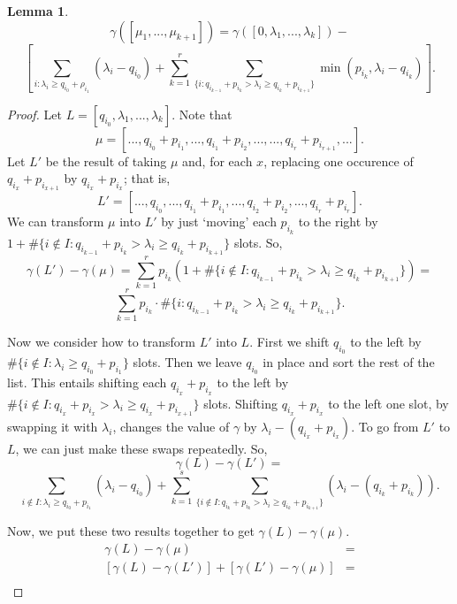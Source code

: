 \documentclass[12pt,psamsfonts]{article}
\newtheorem{lemma}[theorem]{Lemma}
\begin{document}
\begin{lemma}\label{springer_fiber_dim}
    \[\gamma([\mu_1, ..., \mu_{k + 1}]) = \gamma([0, \lambda_1, ..., \lambda_k]) - \] 
    \[\left[\sum_{i : \lambda_i \geq q_{i_0} + \rho_{i_1}} (\lambda_i - q_{i_0}) + \sum_{k = 1}^r \sum_{\{i : q_{i_{k - 1}} + p_{i_k} > \lambda_i \geq q_{i_k} + p_{i_{k + 1}}\}} \min(p_{i_k}, \lambda_i - q_{i_k})\right].\]
\end{lemma}
\begin{proof}
    Let \(L = [q_{i_0}, \lambda_1, ..., \lambda_k]\).
    Note that
    \[\mu = [..., q_{i_0} + p_{i_1}, ..., q_{i_1} + p_{i_2}, ..., ..., q_{i_r} + p_{i_{r + 1}}, ...].\]
    Let \(L'\) be the result of taking \(\mu\) and, for each \(x\), replacing one occurence of \(q_{i_x} + p_{i_{x + 1}}\) by \(q_{i_x} + p_{i_x}\); that is,
    \[L' = [..., q_{i_0}, ..., q_{i_1} + p_{i_1}, ..., q_{i_2} + p_{i_2}, ..., q_{i_r} + p_{i_r}].\]
    We can transform \(\mu\) into \(L'\) by just `moving' each \(p_{i_k}\) to the right by \(1 + \#\{i \notin I : q_{i_{k - 1}} + p_{i_k} > \lambda_i \geq q_{i_k} + p_{i_{k + 1}}\}\) slots.
    So,
    \[\gamma(L') - \gamma(\mu) = \sum_{k = 1}^r p_{i_k} (1 + \#\{i \notin I : q_{i_{k - 1}} + p_{i_k} > \lambda_i \geq q_{i_k} + p_{i_{k + 1}}\}) = \]
    \[\sum_{k = 1}^r p_{i_k} \cdot \#\{i : q_{i_{k - 1}} + p_{i_k} > \lambda_i \geq q_{i_k} + p_{i_{k + 1}}\}.\]
    \par Now we consider how to transform \(L'\) into \(L\).
    First we shift \(q_{i_0}\) to the left by \(\#\{i \notin I : \lambda_i \geq q_{i_0} + p_{i_1}\}\) slots.
    Then we leave \(q_{i_0}\) in place and sort the rest of the list.
    This entails shifting each \(q_{i_x} + p_{i_x}\) to the left by \(\#\{i \notin I : q_{i_x} + p_{i_x} > \lambda_i \geq q_{i_x} + p_{i_{x + 1}}\}\) slots.
    Shifting \(q_{i_x} + p_{i_x}\) to the left one slot, by swapping it with \(\lambda_i\), changes the value of \(\gamma\) by \(\lambda_i - (q_{i_x} + p_{i_x})\).
    To go from \(L'\) to \(L\), we can just make these swaps repeatedly.  
    So,
    \[\gamma(L) - \gamma(L') = \]
    \[\sum_{i \notin I : \lambda_i \geq q_{i_0} + p_{i_1}} (\lambda_i - q_{i_0}) + \sum_{k = 1}^s \sum_{\{i \notin I : q_{i_k} + p_{i_k} > \lambda_i \geq q_{i_k} + p_{i_{k + 1}}\}} (\lambda_i - (q_{i_k} + p_{i_k})).\]
    \par Now, we put these two results together to get \(\gamma(L) - \gamma(\mu)\).
    \begin{align*}
        \gamma(L) - \gamma(\mu) & = \\
        [\gamma(L) - \gamma(L')] + [\gamma(L') - \gamma(\mu)] & = \\

\end{align*}
\end{proof}
\end{document}
